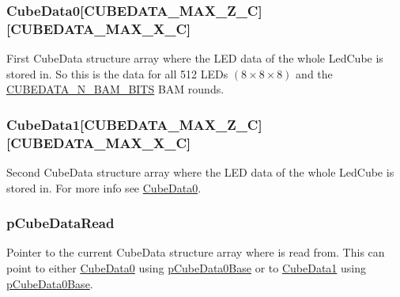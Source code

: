 \subsubsection[{Cube\+Data0}]{ Cube\+Data0\mbox{[}{\bf C\+U\+B\+E\+D\+A\+T\+A\+\_\+\+M\+A\+X\+\_\+\+Z\+\_\+\+C}\mbox{]}\mbox{[}{\bf C\+U\+B\+E\+D\+A\+T\+A\+\_\+\+M\+A\+X\+\_\+\+X\+\_\+\+C}\mbox{]}}\label{structCubeControlData__t_a1cf738638ac947d80a643d159c8eb2a2}
First Cube\+Data structure array where the L\+E\+D data of the whole Led\+Cube is stored in. So this is the data for all 512 L\+E\+Ds $ { (8 \times 8 \times 8) } $ and the \hyperlink{CubeControlData_8h_ae8163b1995363e0daae4ac54ee4d1dd9}{C\+U\+B\+E\+D\+A\+T\+A\+\_\+\+N\+\_\+\+B\+A\+M\+\_\+\+B\+I\+T\+S} B\+A\+M rounds. \hypertarget{structCubeControlData__t_aed097662b3a0f9935e47ee9d209b8da0}{}
\subsubsection[{Cube\+Data1}]{ Cube\+Data1\mbox{[}{\bf C\+U\+B\+E\+D\+A\+T\+A\+\_\+\+M\+A\+X\+\_\+\+Z\+\_\+\+C}\mbox{]}\mbox{[}{\bf C\+U\+B\+E\+D\+A\+T\+A\+\_\+\+M\+A\+X\+\_\+\+X\+\_\+\+C}\mbox{]}}\label{structCubeControlData__t_aed097662b3a0f9935e47ee9d209b8da0}
Second Cube\+Data structure array where the L\+E\+D data of the whole Led\+Cube is stored in. For more info see \hyperlink{structCubeControlData__t_a1cf738638ac947d80a643d159c8eb2a2}{Cube\+Data0}. \hypertarget{structCubeControlData__t_ac61459fc1e13ce1d7fb20222c6d07214}{}
\subsubsection[{p\+Cube\+Data\+Read}]{ p\+Cube\+Data\+Read}\label{structCubeControlData__t_ac61459fc1e13ce1d7fb20222c6d07214}
Pointer to the current Cube\+Data structure array where is read from. This can point to either \hyperlink{structCubeControlData__t_a1cf738638ac947d80a643d159c8eb2a2}{Cube\+Data0} using \hyperlink{CubeControlData_8c_ae726beefa78aea201161f0cf5744dcee}{p\+Cube\+Data0\+Base} or to \hyperlink{structCubeControlData__t_aed097662b3a0f9935e47ee9d209b8da0}{Cube\+Data1} using \hyperlink{CubeControlData_8c_ae726beefa78aea201161f0cf5744dcee}{p\+Cube\+Data0\+Base}. \hypertarget{structCubeControlData__t_a6ced180bdd8e8518a86f8f40888fddf2}{}
